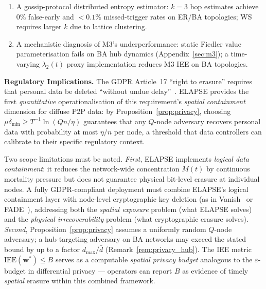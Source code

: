 \documentclass[review,12pt]{elsarticle}
\newcommand{\bfw}{\mathbf{w}}
\newcommand{\IEE}{\mathrm{IEE}}
\newcommand{\Hc}{H_c}
\newcommand{\lambdat}{\lambda_2}
\begin{document}
\begin{enumerate}
        $n=200$), with an adaptive-$\Hc$ countermeasure reducing the BA
        degradation by $\sim 22\%$ (Section~\ref{sec:adversarial}).
  \item A gossip-protocol distributed entropy estimator: $k=3$ hop estimates
        achieve 0\% false-early and $<0.1\%$ missed-trigger rates on ER/BA
        topologies; WS requires larger $k$ due to lattice clustering.
  \item A mechanistic diagnosis of M3's underperformance: static Fiedler
        value parameterisation fails on BA hub dynamics (Appendix~\ref{sec:m3});
        a time-varying $\lambdat(t)$ proxy implementation reduces M3 IEE
        on BA topologies.
\end{enumerate}

\textbf{Regulatory Implications.}
The GDPR Article~17 ``right to erasure'' requires that personal data be
deleted ``without undue delay''~\cite{gdpr2016}.  ELAPSE provides
the first \emph{quantitative} operationalisation of this requirement's
\emph{spatial containment} dimension for diffuse P2P data: by
Proposition~\ref{prop:privacy}, choosing
$\mu\delta_{\min} \geq T^{-1}\ln(Qn/\eta)$ guarantees that any
$Q$-node adversary recovers personal data with probability at most
$\eta/n$ per node, a threshold that data controllers can calibrate to
their specific regulatory context.

Two scope limitations must be noted.  \emph{First}, ELAPSE implements
\emph{logical data containment}: it reduces the network-wide concentration
$M(t)$ by continuous mortality pressure but does not guarantee
physical bit-level erasure at individual nodes.  A fully GDPR-compliant
deployment must combine ELAPSE's logical containment layer with
node-level cryptographic key deletion (as in Vanish~\cite{geambasu2009vanish}
or FADE~\cite{tang2010fade}), addressing both the \emph{spatial exposure}
problem (what ELAPSE solves) and the \emph{physical irrecoverability}
problem (what cryptographic erasure solves).
\emph{Second}, Proposition~\ref{prop:privacy} assumes a uniformly random
$Q$-node adversary; a hub-targeting adversary on BA networks may exceed
the stated bound by up to a factor $d_{\max}/\bar{d}$
(Remark~\ref{rem:privacy_hub}).
The IEE metric $\IEE(\bfw^*) \leq B$ serves as a computable \emph{spatial
privacy budget} analogous to the $\varepsilon$-budget in differential
privacy --- operators can report $B$ as evidence of timely \emph{spatial}
erasure within this combined framework.
\end{document}
